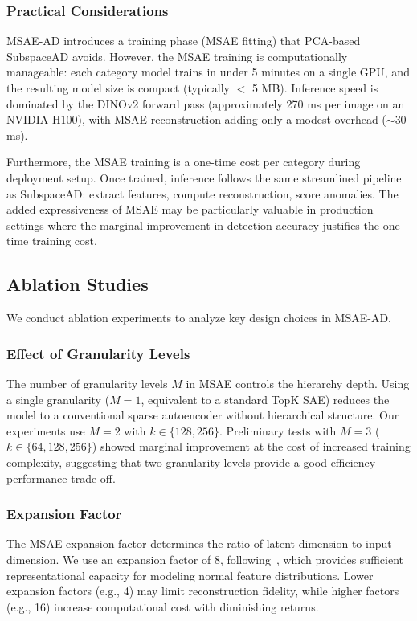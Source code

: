 \subsubsection{Practical Considerations}

MSAE-AD introduces a training phase (MSAE fitting) that PCA-based SubspaceAD avoids.
However, the MSAE training is computationally manageable: each category model trains in under 5 minutes on a single GPU, and the resulting model size is compact (typically $<$ 5 MB).
Inference speed is dominated by the DINOv2 forward pass (approximately 270 ms per image on an NVIDIA H100), with MSAE reconstruction adding only a modest overhead ($\sim$30 ms).

Furthermore, the MSAE training is a one-time cost per category during deployment setup.
Once trained, inference follows the same streamlined pipeline as SubspaceAD: extract features, compute reconstruction, score anomalies.
The added expressiveness of MSAE may be particularly valuable in production settings where the marginal improvement in detection accuracy justifies the one-time training cost.

\subsection{Ablation Studies}

We conduct ablation experiments to analyze key design choices in MSAE-AD.

\subsubsection{Effect of Granularity Levels}

The number of granularity levels $M$ in MSAE controls the hierarchy depth.
Using a single granularity ($M=1$, equivalent to a standard TopK SAE) reduces the model to a conventional sparse autoencoder without hierarchical structure.
Our experiments use $M=2$ with $k \in \{128, 256\}$.
Preliminary tests with $M=3$ ($k \in \{64, 128, 256\}$) showed marginal improvement at the cost of increased training complexity, suggesting that two granularity levels provide a good efficiency--performance trade-off.

\subsubsection{Expansion Factor}

The MSAE expansion factor determines the ratio of latent dimension to input dimension.
We use an expansion factor of 8, following~\cite{Zaigrajew2025MSAE}, which provides sufficient representational capacity for modeling normal feature distributions.
Lower expansion factors (e.g., 4) may limit reconstruction fidelity, while higher factors (e.g., 16) increase computational cost with diminishing returns.

